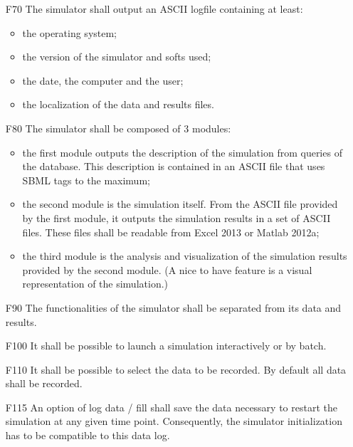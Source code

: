\begin{enumerate}
  \item[F70] The simulator shall output an ASCII logfile containing at least:
  \begin{itemize}
    \item the operating system;
    \item the version of the simulator and softs used;
    \item the date, the computer and the user;
    \item the localization of the data and results files.
  \end{itemize}
  \item[F80] The simulator shall be composed of 3 modules:
  \begin{itemize}
    \item the first module outputs the description of the simulation from queries of the database. This description is contained in an ASCII file that uses SBML tags to the maximum;
    \item the second module is the simulation itself. From the ASCII file provided by the first module, it outputs the simulation results in a set of ASCII files. These files shall be readable from Excel 2013 or Matlab 2012a;
    \item the third module is the analysis and visualization of the simulation results provided by the second module. (A nice to have feature is a visual representation of the simulation.)
  \end{itemize}
  \item[F90] The functionalities of the simulator shall be separated from its data and results.
  \item[F100] It shall be possible to launch a simulation interactively or by batch.
  \item[F110] It shall be possible to select the data to be recorded. By default all data shall be recorded.
  \item[F115] An option of log data / fill shall save the data necessary to restart the simulation at any given time point. Consequently, the simulator initialization has to be compatible to this data log.
  \\


\end{enumerate}
